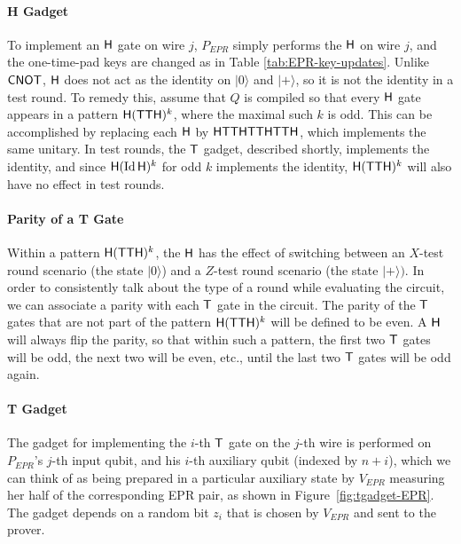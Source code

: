 \documentclass[11pt]{article}
\theoremstyle{remark}
\theoremstyle{definition}
\newcommand{\ket}[1]{|#1\rangle}
\newcommand{\Id}{\ensuremath{\mathop{\rm Id}\nolimits}}
\begin{document}
\paragraph{H Gadget} To implement an $\sf H$ gate on wire $j$, $P_{EPR}$ simply performs the $\sf H$ on wire $j$, and the one-time-pad keys are changed as in Table \ref{tab:EPR-key-updates}. Unlike $\sf CNOT$, $\sf H$ does not act as the identity on $\ket{0}$ and $\ket{+}$, so it is not the identity in a test round. To remedy this, assume that $Q$ is compiled so that every $\sf H$ gate appears in a pattern ${\sf H}({\sf TTH})^k$, where the maximal such $k$ is odd. This can be accomplished by replacing each $\sf H$ by $\sf HTTHTTHTTH$, which implements the same unitary. In test rounds, the $\sf T$ gadget, described shortly, implements the identity, and since ${\sf H}(\Id {\sf H})^k$ for odd $k$ implements the identity, ${\sf H}({\sf TTH})^k$ will also have no effect in test rounds. 

\paragraph{Parity of a T Gate} Within a pattern ${\sf H}({\sf TTH})^k$, the $\sf H$ has the effect of switching between an $X$-test round scenario (the state $\ket{0}$) and a $Z$-test round scenario (the state $\ket{+})$. In order to consistently talk about the type of a round while evaluating the circuit, we can associate a parity with each $\sf T$ gate in the circuit. The parity of the $\sf T$ gates that are not part of the pattern ${\sf H}({\sf TTH})^k$ will be defined to be even. A ${\sf H}$ will always flip the parity, so that within such a pattern, the first two ${\sf T}$ gates will be odd, the next two will be even, etc., until the last two $\sf T$ gates will be odd again. 

\paragraph{T Gadget} The gadget for implementing the $i$-th $\sf T$ gate on the $j$-th wire is performed on $P_{EPR}$'s $j$-th input qubit, and his $i$-th auxiliary qubit (indexed by $n+i$), which we can think of as being prepared in a particular auxiliary state by $V_{EPR}$ measuring her half of the corresponding EPR pair, as shown in Figure~\ref{fig:tgadget-EPR}. The gadget depends on a random bit $z_i$ that is chosen by $V_{EPR}$ and sent to the prover. 



\end{document}
